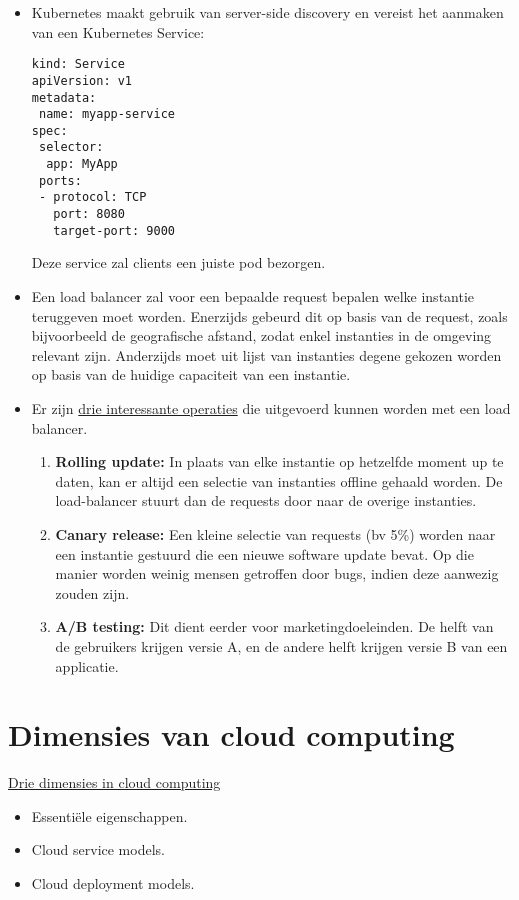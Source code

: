 \documentclass{report}
\begin{document}
\begin{itemize}
		\item[\info] Kubernetes maakt gebruik van server-side discovery en vereist het aanmaken van een Kubernetes Service:
		\begin{lstlisting}
kind: Service
apiVersion: v1
metadata:
 name: myapp-service
spec:
 selector:
  app: MyApp
 ports:
 - protocol: TCP
   port: 8080
   target-port: 9000
		\end{lstlisting}
		Deze service zal clients een juiste pod bezorgen. 
	
		\item[\info] Een load balancer zal voor een bepaalde request bepalen welke instantie teruggeven moet worden. Enerzijds gebeurd dit op basis van de request, zoals bijvoorbeeld de geografische afstand, zodat enkel instanties in de omgeving relevant zijn. Anderzijds moet uit lijst van instanties degene gekozen worden op basis van de huidige capaciteit van een instantie.

		\item[\info] Er zijn \underline{drie interessante operaties} die uitgevoerd kunnen worden met een load balancer.
		\begin{enumerate}
			\item \textbf{Rolling update:} In plaats van elke instantie op hetzelfde moment up te daten, kan er altijd een selectie van instanties offline gehaald worden. De load-balancer stuurt dan de requests door naar de overige instanties.
			\item \textbf{Canary release:} Een kleine selectie van requests (bv 5\%) worden naar een instantie gestuurd die een nieuwe software update bevat. Op die manier worden weinig mensen getroffen door bugs, indien deze aanwezig zouden zijn.  
			\item \textbf{A/B testing:} Dit dient eerder voor marketingdoeleinden. De helft van de gebruikers krijgen versie A, en de andere helft krijgen versie B van een applicatie.
		\end{enumerate}
	\end{itemize}

	\section{Dimensies van cloud computing}
	\underline{Drie dimensies in cloud computing}
	\begin{itemize}
		\item[\info] Essentiële eigenschappen.
		\item[\info] Cloud service models.
		\item[\info] Cloud deployment models.
	\end{itemize}
\end{document}
